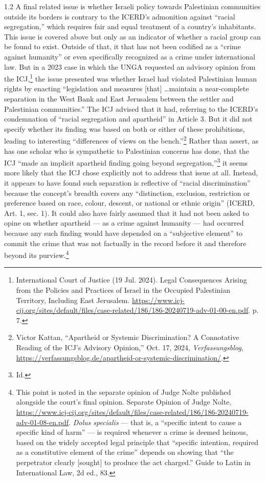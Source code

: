 \documentclass[../unravbook.tex]{subfiles}
\begin{document}
\begin{spacing}{1.2}
A final related issue is whether Israeli policy towards Palestinian communities outside its borders is contrary to the ICERD's admonition against ``racial segregation,'' which requires fair and equal treatment of a country's inhabitants. This issue is covered above but only as an indicator of whether a racial group can be found to exist. Outside of that, it that has not been codified as a ``crime against humanity'' or even specifically recognized as a crime under international law. But in a 2023 case in which the UNGA requested an advisory opinion from the ICJ,\footnote{International Court of Justice (19 Jul. 2024). Legal Consequences Arising from the Policies and Practices of Israel in the Occupied Palestinian Territory, Including East Jerusalem. \url{https://www.icj-cij.org/sites/default/files/case-related/186/186-20240719-adv-01-00-en.pdf}. p. 7.} the issue presented was whether Israel had violated Palestinian human rights by enacting ``legislation and measures [that] \ldots maintain a near-complete separation in the West Bank and East Jerusalem between the settler and Palestinian communities.'' The ICJ advised that it had, referring to the ICERD's condemnation of ``racial segregation and apartheid'' in Article 3. But it did not specify whether its finding was based on both or either of these prohibitions, leading to interesting ``differences of views on the bench.''\footnote{Victor Kattan, ``Apartheid or Systemic Discrimination? A Connotative Reading of the ICJ's Advisory Opinion,'' Oct. 17, 2024, \textit{Verfassungsblog}, \url{https://verfassungsblog.de/apartheid-or-systemic-discrimination/}.}  Rather than assert, as has one scholar who is sympathetic to Palestinian concerns has done, that the ICJ ``made an implicit apartheid finding going beyond segregation,''\footnote{Id.} it seems more likely that the ICJ chose explicitly not to address that issue at all. Instead, it appears to have found such separation is reflective of \enquote{racial discrimination} because the concept's breadth covers any \enquote{distinction, exclusion, restriction or preference based on race, colour, descent, or national or ethnic origin} (ICERD, Art. 1, sec. 1). It could also have fairly assumed that it had not been asked to opine on whether apartheid --- as a crime against humanity --- had  occurred because any such finding would have depended on a ``subjective element'' to commit the crime that was not factually in the record before it and therefore beyond its purview.\footnote{This point is noted in the separate opinion of Judge Nolte published alongside the court's final opinion. Separate Opinion of Judge Nolte, \url{https://www.icj-cij.org/sites/default/files/case-related/186/186-20240719-adv-01-08-en.pdf}. \textit{Dolus specialis} --- that is, a \enquote{specific intent to cause a specific kind of harm} --- is required whenever a crime is deemed heinous, based on the widely accepted legal principle that \enquote{specific intention, required as a constitutive element of the crime}  depends on showing that \enquote{the perpetrator clearly [sought] to produce the act charged.} Guide to Latin in International Law, 2d ed., 83.}


\end{spacing}
\end{document}
